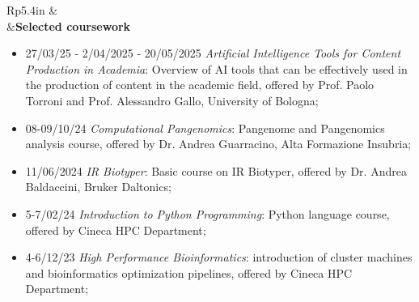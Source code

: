 \documentclass[letterpaper, 11pt]{article}
\newcommand{\headingfont}{\Large\color{OliveGreen}}
\newenvironment{SectionTable}[1]{
	\renewcommand*{\arraystretch}{1.7}
	\setlength{\tabcolsep}{10pt}
	\begin{longtable}{Rp{5.4in}} & #1 \\}
{\end{longtable}\vspace{-.3cm}}
\newenvironment{SectionTableSingleSpace}[1]{
	\renewcommand*{\arraystretch}{1.2}
	\setlength{\tabcolsep}{10pt}
	\begin{longtable}{Rp{5.2in}} & #1 \\[0.6em]}
{\end{longtable}\vspace{-.3cm}}
\begin{document}
\begin{SectionTable}{}
&\textbf{Selected coursework}
\begin{itemize}[itemsep=0pt, leftmargin=*]
\item 27/03/25 - 2/04/2025 - 20/05/2025 \textit{Artificial Intelligence Tools for Content Production in Academia}: Overview of AI tools that can be effectively used in the production of content in the academic field, offered by Prof. Paolo Torroni and Prof. Alessandro Gallo, University of Bologna;
\item 08-09/10/24 \textit{Computational Pangenomics}: Pangenome and Pangenomics analysis course, offered by Dr. Andrea Guarracino, Alta Formazione Insubria;
\item 11/06/2024 \textit{IR Biotyper}: Basic course on IR Biotyper, offered by Dr. Andrea Baldaccini, Bruker Daltonics;
\item 5-7/02/24 \textit{Introduction to Python Programming}: Python language course, offered by Cineca HPC Department;
\item 4-6/12/23 \textit{High Performance Bioinformatics}: introduction of cluster machines and bioinformatics optimization pipelines, offered by Cineca HPC Department; 
\end{itemize}
\end{SectionTable}







\end{document}
